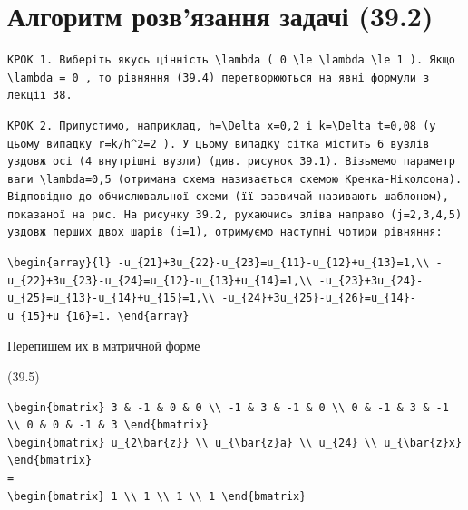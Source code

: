 \documentclass[
  ukrainian,
]{article}
\begin{document}
\section{Алгоритм розв'язання задачі
(39.2)}\label{ux430ux43bux433ux43eux440ux438ux442ux43c-ux440ux43eux437ux432ux44fux437ux430ux43dux43dux44f-ux437ux430ux434ux430ux447ux456-39.2}

\begin{verbatim}
КРОК 1. Виберіть якусь цінність \lambda ( 0 \le \lambda \le 1 ). Якщо \lambda = 0 , то рівняння (39.4) перетворюються на явні формули з лекції 38.
\end{verbatim}

\begin{verbatim}
КРОК 2. Припустимо, наприклад, h=\Delta x=0,2 і k=\Delta t=0,08 (у цьому випадку r=k/h^2=2 ). У цьому випадку сітка містить 6 вузлів уздовж осі (4 внутрішні вузли) (див. рисунок 39.1). Візьмемо параметр ваги \lambda=0,5 (отримана схема називається схемою Кренка-Ніколсона). Відповідно до обчислювальної схеми (її зазвичай називають шаблоном), показаної на рис. На рисунку 39.2, рухаючись зліва направо (j=2,3,4,5) уздовж перших двох шарів (i=1), отримуємо наступні чотири рівняння:
\end{verbatim}

\begin{verbatim}
\begin{array}{l} -u_{21}+3u_{22}-u_{23}=u_{11}-u_{12}+u_{13}=1,\\ -u_{22}+3u_{23}-u_{24}=u_{12}-u_{13}+u_{14}=1,\\ -u_{23}+3u_{24}-u_{25}=u_{13}-u_{14}+u_{15}=1,\\ -u_{24}+3u_{25}-u_{26}=u_{14}-u_{15}+u_{16}=1. \end{array}
\end{verbatim}

Перепишем их в матричной форме

(39.5)

\begin{verbatim}
\begin{bmatrix} 3 & -1 & 0 & 0 \\ -1 & 3 & -1 & 0 \\ 0 & -1 & 3 & -1 \\ 0 & 0 & -1 & 3 \end{bmatrix}
\begin{bmatrix} u_{2\bar{z}} \\ u_{\bar{z}a} \\ u_{24} \\ u_{\bar{z}x} \end{bmatrix}
=
\begin{bmatrix} 1 \\ 1 \\ 1 \\ 1 \end{bmatrix}
\end{verbatim}
\end{document}
